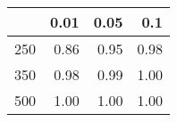 % 
\begin{tabular}{rrrr}
  \hline
 & 0.01 & 0.05 & 0.1 \\ 
  \hline
250 & 0.86 & 0.95 & 0.98 \\ 
  350 & 0.98 & 0.99 & 1.00 \\ 
  500 & 1.00 & 1.00 & 1.00 \\ 
   \hline
\end{tabular}
